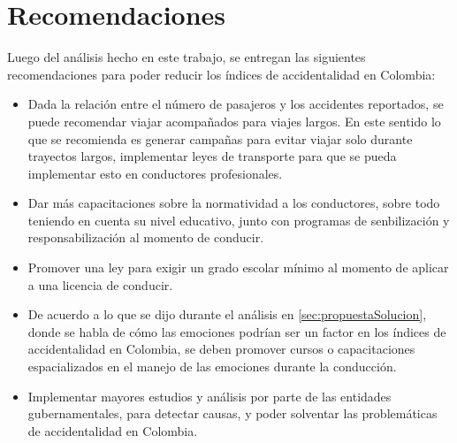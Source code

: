 \section*{Recomendaciones}
Luego del análisis hecho en este trabajo, se entregan las siguientes recomendaciones para poder reducir los índices de accidentalidad en Colombia:
\begin{itemize}
    \item Dada la relación entre el número de pasajeros y los accidentes reportados, se puede recomendar viajar acompañados para viajes largos. En este sentido lo que se recomienda es generar campañas para evitar viajar solo durante trayectos largos, implementar leyes de transporte para que se pueda implementar esto en conductores profesionales.
    \item Dar más capacitaciones sobre la normatividad a los conductores, sobre todo teniendo en cuenta su nivel educativo, junto con programas de senbilización y responsabilización al momento de conducir.
    \item Promover una ley para exigir un grado escolar mínimo al momento de aplicar a una licencia de conducir.
    \item De acuerdo a lo que se dijo durante el análisis en \ref{sec:propuestaSolucion}, donde se habla de cómo las emociones podrían ser un factor en los índices de accidentalidad en Colombia, se deben promover cursos o capacitaciones espacializados en el manejo de las emociones durante la conducción.
    \item Implementar mayores estudios y análisis por parte de las entidades gubernamentales, para detectar causas, y poder solventar las problemáticas de accidentalidad en Colombia.
\end{itemize}